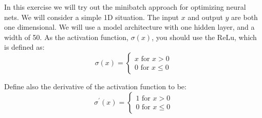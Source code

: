 In this exercise we will try out the minibatch approach for optimizing neural nets. We will consider a simple 1D situation. The input $x$ and output $y$ are both one dimensional. We will use a model architecture with one hidden layer, and a width of 50. As the activation function, $\sigma(x)$, you should use the $\mathrm{ReLu}$, which is defined as:
$$
\sigma(x)=\left\{\begin{array}{l}
x \text { for } x>0 \\
0 \text { for } x \leq 0
\end{array}\right.
$$

Define also the derivative of the activation function to be:
$$
\sigma^{\prime}(x)=\left\{\begin{array}{l}
1 \text { for } x>0 \\
0 \text { for } x \leq 0
\end{array}\right.
$$

